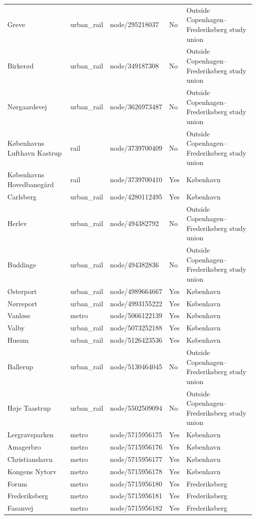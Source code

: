 \begin{landscape}
\begin{longtable}{>{\raggedright\arraybackslash}p{8.0cm}>{\raggedright\arraybackslash}p{2.4cm}>{\raggedright\arraybackslash}p{3.7cm}>{\raggedright\arraybackslash}p{1.5cm}>{\raggedright\arraybackslash}p{5.2cm}}
Greve & urban\_\allowbreak{}rail & node/295218037 & No & Outside Copenhagen--Frederiksberg study union \\
Birkerød & urban\_\allowbreak{}rail & node/349187308 & No & Outside Copenhagen--Frederiksberg study union \\
Nørgaardsvej & urban\_\allowbreak{}rail & node/3626973487 & No & Outside Copenhagen--Frederiksberg study union \\
Københavns Lufthavn Kastrup & rail & node/3739700409 & No & Outside Copenhagen--Frederiksberg study union \\
Københavns Hovedbanegård & rail & node/3739700410 & Yes & København \\
Carlsberg & urban\_\allowbreak{}rail & node/4280112495 & Yes & København \\
Herlev & urban\_\allowbreak{}rail & node/494382792 & No & Outside Copenhagen--Frederiksberg study union \\
Buddinge & urban\_\allowbreak{}rail & node/494382836 & No & Outside Copenhagen--Frederiksberg study union \\
Østerport & urban\_\allowbreak{}rail & node/4989664667 & Yes & København \\
Nørreport & urban\_\allowbreak{}rail & node/4993155222 & Yes & København \\
Vanløse & metro & node/5066122139 & Yes & København \\
Valby & urban\_\allowbreak{}rail & node/5073252188 & Yes & København \\
Husum & urban\_\allowbreak{}rail & node/5126423536 & Yes & København \\
Ballerup & urban\_\allowbreak{}rail & node/5130464045 & No & Outside Copenhagen--Frederiksberg study union \\
Høje Taastrup & urban\_\allowbreak{}rail & node/5502509094 & No & Outside Copenhagen--Frederiksberg study union \\
Lergravsparken & metro & node/5715956175 & Yes & København \\
Amagerbro & metro & node/5715956176 & Yes & København \\
Christianshavn & metro & node/5715956177 & Yes & København \\
Kongens Nytorv & metro & node/5715956178 & Yes & København \\
Forum & metro & node/5715956180 & Yes & Frederiksberg \\
Frederiksberg & metro & node/5715956181 & Yes & Frederiksberg \\
Fasanvej & metro & node/5715956182 & Yes & Frederiksberg \\

\end{longtable}
\end{landscape}
